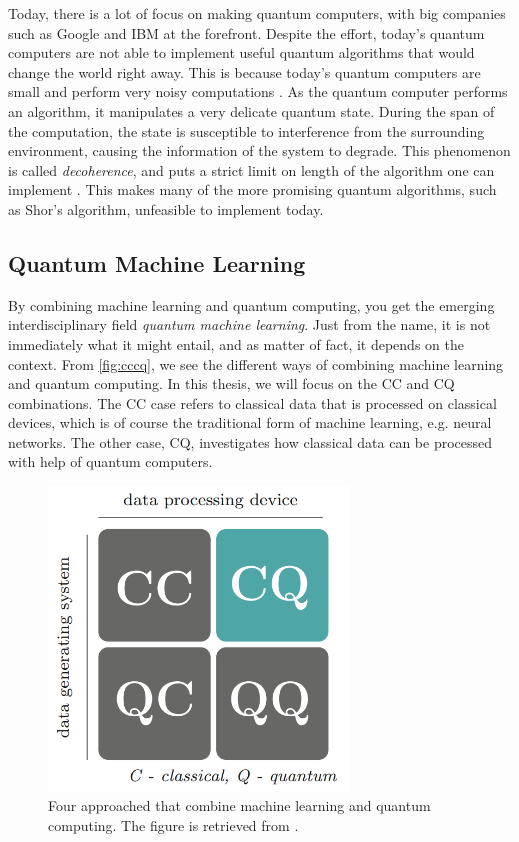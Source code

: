 Today, there is a lot of focus on making quantum computers, with big companies such as Google and IBM at the forefront. Despite the effort, today's quantum computers are not able to implement useful quantum algorithms that would change the world right away. This is because today's quantum computers are small and perform very noisy computations \cite{Preskill_2018}. As the quantum computer performs an algorithm, it manipulates a very delicate quantum state. During the span of the computation, the state is susceptible to interference from the surrounding environment, causing the information of the system to degrade. This phenomenon is called \emph{decoherence}, and puts a strict limit on length of the algorithm one can implement \cite{saki2019study}. This makes many of the more promising quantum algorithms, such as Shor's algorithm, unfeasible to implement today.


\subsection{Quantum Machine Learning}\label{sec:Quantum Machine Learning}
By combining machine learning and quantum computing, you get the emerging interdisciplinary field \emph{quantum machine learning}. Just from the name, it is not immediately what it might entail, and as matter of fact, it depends on the context. From \autoref{fig:cccq}, we see the different ways of combining machine learning and quantum computing. In this thesis, we will focus on the CC and CQ combinations. The CC case refers to classical data that is processed on classical devices, which is of course the traditional form of machine learning, e.g. neural networks. The other case, CQ, investigates how classical data can be processed with help of quantum computers.

\begin{figure}[htp]
    \centering
    \includegraphics[width=8cm]{latex/figures/cccq.PNG}
    \caption{Four approached that combine machine learning and quantum computing. The figure is retrieved from \citet{SupervisedwquantumComputers}.}
    \label{fig:cccq}
\end{figure}

